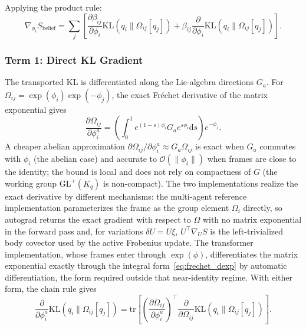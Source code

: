 \documentclass[11pt]{article}
\begin{document}
Applying the product rule:
\begin{equation}
\nabla_{\phi_i} S_{\mathrm{belief}} = \sum_j \left[ \frac{\partial \beta_{ij}}{\partial \phi_i} \mathrm{KL}(q_i \| \Omega_{ij}[q_j]) + \beta_{ij} \frac{\partial}{\partial \phi_i}\mathrm{KL}(q_i \| \Omega_{ij}[q_j]) \right].
\end{equation}

\subsubsection*{Term 1: Direct KL Gradient}

The transported KL is differentiated along the Lie-algebra directions $G_a$. For $\Omega_{ij} = \exp(\phi_i)\exp(-\phi_j)$, the exact Fr\'echet derivative of the matrix exponential gives
\begin{equation}
\frac{\partial \Omega_{ij}}{\partial \phi_i^a} = \left(\int_0^1 e^{(1-s)\phi_i} G_a e^{s\phi_i} \mathrm{d}s\right) e^{-\phi_j}.
\label{eq:frechet_dexp}
\end{equation}
A cheaper abelian approximation $\partial \Omega_{ij}/\partial \phi_i^a \approx G_a \Omega_{ij}$ is exact when $G_a$ commutes with $\phi_i$ (the abelian case) and accurate to $\mathcal{O}(\|\phi_i\|)$ when frames are close to the identity; the bound is local and does not rely on compactness of $G$ (the working group $\mathrm{GL}^+(K_q)$ is non-compact). The two implementations realize the exact derivative by different mechanisms: the multi-agent reference implementation parameterizes the frame as the group element $\Omega_i$ directly, so autograd returns the exact gradient with respect to $\Omega$ with no matrix exponential in the forward pass and, for variations $\delta U=U\xi$, $U^\top\nabla_U S$ is the left-trivialized body covector used by the active Frobenius update. The transformer implementation, whose frames enter through $\exp(\phi)$, differentiates the matrix exponential exactly through the integral form~\eqref{eq:frechet_dexp} by automatic differentiation, the form required outside that near-identity regime. With either form, the chain rule gives
\begin{equation}
\frac{\partial}{\partial \phi_i^a}\mathrm{KL}(q_i \| \Omega_{ij}[q_j]) = \mathrm{tr}\left[\left(\frac{\partial \Omega_{ij}}{\partial \phi_i^a}\right)^\top \frac{\partial}{\partial \Omega_{ij}}\mathrm{KL}(q_i \| \Omega_{ij}[q_j])\right].
\end{equation}
\end{document}

